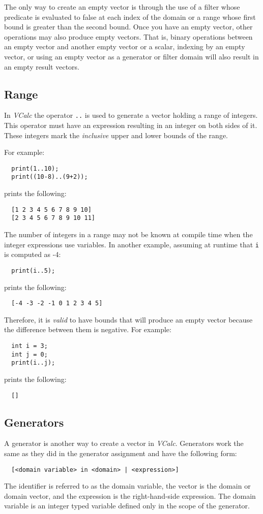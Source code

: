 \documentclass{article}
\newcommand{\code}[1]{\texttt{\textmd{#1}}}
\begin{document}
The only way to create an empty vector is through the use of a filter whose predicate is evaluated
to false at each index of the domain or a range whose first bound is greater than the second bound.
Once you have an empty vector, other operations may also produce empty vectors. That is, binary
operations between an empty vector and another empty vector or a scalar, indexing by an empty
vector, or using an empty vector as a generator or filter domain will also result in an empty
result vectors.

\subsection{Range}
In \textit{VCalc} the operator \code{..} is used to generate a vector holding a range of integers.
This operator must have an expression resulting in an integer on both sides of it. These integers
mark the \textit{inclusive} upper and lower bounds of the range.

For example:
\begin{lstlisting}
  print(1..10);
  print((10-8)..(9+2));
\end{lstlisting}

prints the following:
\begin{lstlisting}
  [1 2 3 4 5 6 7 8 9 10]
  [2 3 4 5 6 7 8 9 10 11]
\end{lstlisting}

The number of integers in a range may not be known at compile time when the integer expressions use
variables. In another example, assuming at runtime that \code{i} is computed as -4:
\begin{lstlisting}
  print(i..5);
\end{lstlisting}

prints the following:
\begin{lstlisting}
  [-4 -3 -2 -1 0 1 2 3 4 5]
\end{lstlisting}

Therefore, it is \textit{valid} to have bounds that will produce an empty vector because the
difference between them is negative. For example:
\begin{lstlisting}
  int i = 3;
  int j = 0;
  print(i..j);
\end{lstlisting}

prints the following:
\begin{lstlisting}
  []
\end{lstlisting}

\subsection{Generators}
A generator is another way to create a vector in \textit{VCalc}. Generators work the same as they
did in the generator assignment and have the following form:
\begin{lstlisting}
  [<domain variable> in <domain> | <expression>]
\end{lstlisting}
The identifier is referred to as the domain variable, the vector is the domain or domain vector,
and the expression is the right-hand-side expression. The domain variable is an integer typed
variable defined only in the scope of the generator.
\end{document}
